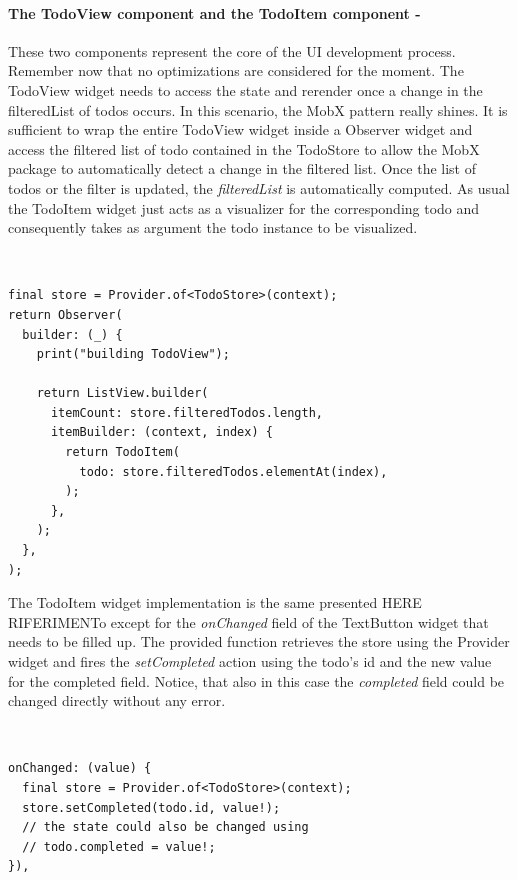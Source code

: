 \paragraph{The TodoView component and the TodoItem component - }
\label{subpar:todo_app_bloc_core_state} These two components represent the core of the UI development process. Remember now that no optimizations are considered for the moment. The TodoView widget needs to access the state and rerender once a change in the filteredList of todos occurs. In this scenario, the MobX pattern really shines. It is sufficient to wrap the entire TodoView widget inside a Observer widget and access the filtered list of todo contained in the TodoStore to allow the MobX package to automatically detect a change in the filtered list. Once the list of todos or the filter is updated, the \textit{filteredList} is automatically computed. As usual the TodoItem widget just acts as a visualizer for the corresponding todo and consequently takes as argument the todo instance to be visualized.
\begin{code}
\mbox{}\\
 \mbox{}
		\label{code:2.14}
\begin{verbatim}
final store = Provider.of<TodoStore>(context);
return Observer(
  builder: (_) {
    print("building TodoView");

    return ListView.builder(
      itemCount: store.filteredTodos.length,
      itemBuilder: (context, index) {
        return TodoItem(
          todo: store.filteredTodos.elementAt(index),
        );
      },
    );
  },
);
\end{verbatim}
\mbox{}
\end{code}

The TodoItem widget implementation is the same presented HERE RIFERIMENTo except for the \textit{onChanged} field of the TextButton widget that needs to be filled up. The provided function retrieves the store using the Provider widget and fires the \textit{setCompleted }action using the todo’s id and the new value for the completed field. Notice, that also in this case the \textit{completed} field could be changed directly without any error.
\begin{code}
\mbox{}\\
 \mbox{}
		\label{code:2.14}
\begin{verbatim}
onChanged: (value) {
  final store = Provider.of<TodoStore>(context);
  store.setCompleted(todo.id, value!);
  // the state could also be changed using
  // todo.completed = value!;
}),
\end{verbatim}
\mbox{}
\end{code}

